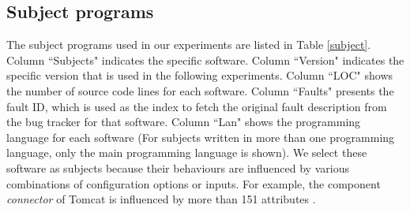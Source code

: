 \documentclass{sig-alternate-05-2015}
\begin{document}
{{{{%

%

\subsection{Subject programs}\label{sec:subject}
The subject programs used in our experiments are listed in Table \ref{subject}. Column ``Subjects" indicates the specific software. Column ``Version" indicates the specific version that is used in the following experiments. Column ``LOC" shows the number of source code lines for each software. Column ``Faults" presents the fault ID, which is used as the index to fetch the original fault description from the bug tracker for that software. Column ``Lan" shows the programming language for each software (For subjects written in more than one programming language, only the main programming language is shown).  We select these software as subjects because their behaviours are influenced by various combinations of configuration options or inputs. For example, the component \emph{connector} of Tomcat is influenced by more than 151 attributes \cite{tomcatconnector}.

}}}}
\end{document}
